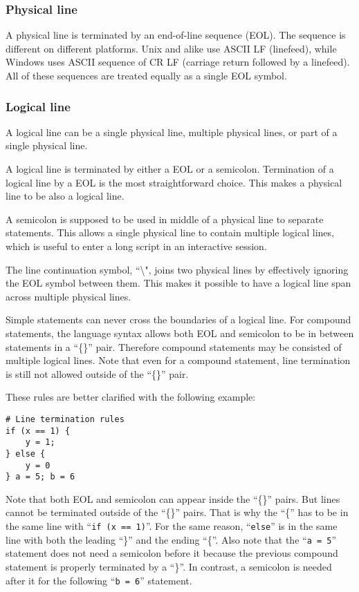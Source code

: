 \documentclass[10pt,a4paper]{article}
\begin{document}
\subsubsection{Physical line}
A physical line is terminated by an end-of-line sequence (EOL). The
sequence is different on different platforms. Unix and alike use ASCII LF
(linefeed), while Windows uses ASCII sequence of CR LF (carriage return followed
by a linefeed). All of these sequences are treated equally as a single 
EOL symbol.

\subsubsection{Logical line}
A logical line can be a single physical line, multiple physical lines, or
part of a single physical line.

A logical line is terminated by either a EOL or a semicolon. 
Termination of a logical line by a EOL is the most straightforward choice. 
This makes a physical line to be also a logical line.

A semicolon is supposed to be used in middle of a physical line to separate 
statements. This allows a single physical line to contain multiple logical
lines, which is useful to enter a long script in an interactive session.

The line continuation symbol, ``\textbackslash", joins two physical lines
by effectively ignoring the EOL symbol between them.
This makes it possible to have a logical line span across multiple 
physical lines. 

Simple statements can never cross the boundaries of a logical line.
For compound statements, the language syntax allows both EOL and semicolon
to be in between statements in a ``\{\}'' pair. Therefore compound statements
may be consisted of multiple logical lines. Note that even for a compound 
statement, line termination is still not allowed outside of the 
``\{\}'' pair. 

These rules are better clarified with the following example:

\begin{lstlisting}
# Line termination rules
if (x == 1) {
    y = 1;
} else {
    y = 0
} a = 5; b = 6
\end{lstlisting}

Note that both EOL and semicolon can appear inside the ``\{\}'' pairs. 
But lines cannot be terminated outside of the ``\{\}'' pairs. That is
why the ``\{'' has to be in the same line with ``\lstinline$if (x == 1)$''.
For the same reason, ``\lstinline$else$'' is in the same line with both 
the leading
``\}'' and the ending ``\{''. Also note that the ``\lstinline$a = 5$'' 
statement does
not need a semicolon before it because the previous compound statement
is properly terminated by a ``\}''. In contrast, a semicolon is needed
after it for the following ``\lstinline$b = 6$'' statement.
\end{document}
